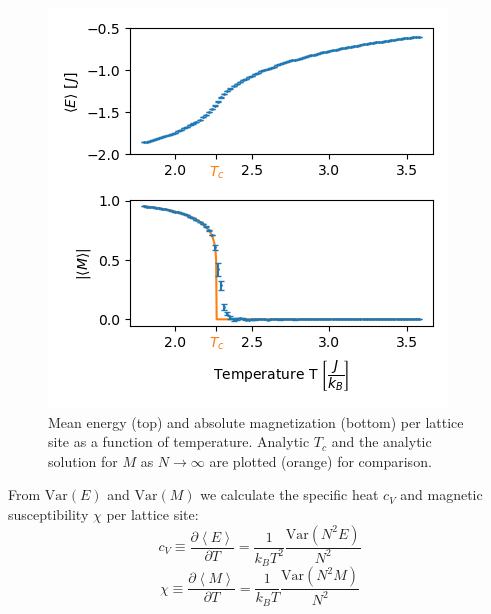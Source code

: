 \documentclass[letter,scriptaddress,twocolumn, prl,nofootinbib]{revtex4}
\newcommand{\submin}[1]{\left\langle #1 \right\rangle}
\newcommand{\Var}[1]{\text{Var}\left( #1 \right)}
\begin{document}
\begin{figure}[h]
	\begin{center}
		\includegraphics[width=.5\textwidth]{figs/fig2_EMplots.png}
		\caption{Mean energy (top) and absolute magnetization (bottom) per lattice site as a function of temperature. Analytic $T_c$ and the analytic solution for $M$ as $N\rightarrow\infty$ are plotted (orange) for comparison.}
		\label{fig:fig2}
	\end{center}
\end{figure}

From $\Var{E}$ and $\Var{M}$ we calculate the specific heat $c_V$ and magnetic susceptibility $\chi$ per lattice site:
\begin{equation}
	c_V \equiv \frac{\partial \submin{E}}{\partial T} = \frac{1}{k_BT^2}\frac{\Var{N^2 E}}{N^2} \label{eq:cv}
\end{equation}
\begin{equation}
	\chi \equiv \frac{\partial \submin{M}}{\partial T} = \frac{1}{k_BT}\frac{\Var{N^2 M}}{N^2}	\label{eq:chi}
\end{equation}
\end{document}
